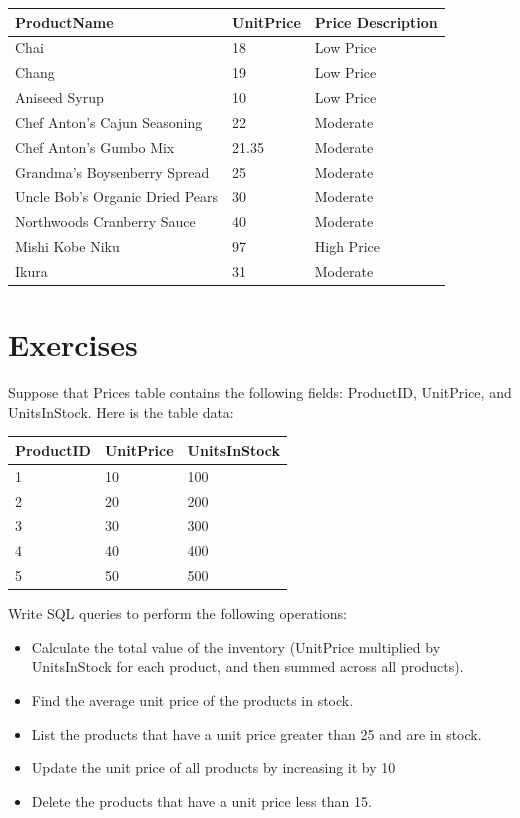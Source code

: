 \documentclass[10pt]{article}
\begin{document}
\begin{table}[H]
\begin{tabular}{|l|l|l|}
\hline
ProductName	& UnitPrice	& Price Description \\
\hline
Chai	& 18	& Low Price \\
Chang	& 19	& Low Price \\
Aniseed Syrup	& 10	& Low Price \\
Chef Anton's Cajun Seasoning	& 22	& Moderate \\
Chef Anton's Gumbo Mix	& 21.35	& Moderate \\
Grandma's Boysenberry Spread	& 25	& Moderate \\
Uncle Bob's Organic Dried Pears	& 30	& Moderate \\
Northwoods Cranberry Sauce	& 40	& Moderate \\
Mishi Kobe Niku	& 97	& High Price \\
Ikura	& 31	& Moderate \\
\hline
\end{tabular}
\end{table}


\section{Exercises}

Suppose that Prices table contains the following fields: ProductID, UnitPrice, and UnitsInStock.
Here is the table data:

\begin{table}[H]
\begin{tabular}{|l|l|l|}
\hline
ProductID	& UnitPrice	& UnitsInStock \\
\hline
1	& 10	& 100 \\
2	& 20	& 200 \\
3	& 30	& 300 \\
4	& 40	& 400 \\
5	& 50	& 500 \\
\hline
\end{tabular}
\end{table}

Write SQL queries to perform the following operations:
\begin{itemize}
    \item Calculate the total value of the inventory (UnitPrice multiplied by UnitsInStock for each product, and then summed across all products).
    \item Find the average unit price of the products in stock.
    \item List the products that have a unit price greater than 25 and are in stock.
    \item Update the unit price of all products by increasing it by 10%
    \item Delete the products that have a unit price less than 15.
\end{itemize}
\end{document}
